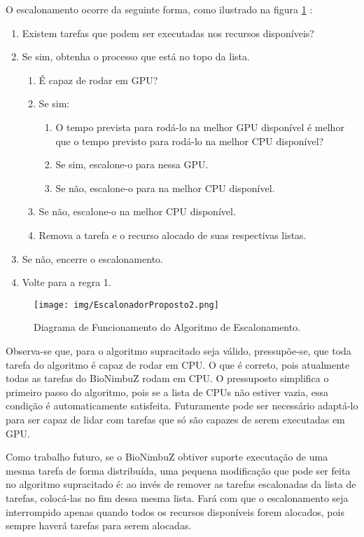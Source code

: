 O escalonamento ocorre da seguinte forma, como ilustrado na figura \ref{Escalonamento} :
\begin{enumerate}
	\item Existem tarefas que podem ser executadas nos recursos disponíveis?
	\item Se sim, obtenha o processo que está no topo da lista.
	\begin{enumerate}
		\item É capaz de rodar em GPU?
		\item Se sim:
		\begin{enumerate}
			\item O tempo prevista para rodá-lo na melhor \acrshort{GPU} disponível é melhor que o tempo previsto para rodá-lo na melhor \acrshort{CPU} disponível?
			\item Se sim, escalone-o para nessa \acrshort{GPU}.
			\item Se não, escalone-o para na melhor \acrshort{CPU} disponível.
		\end{enumerate}
		\item Se não, escalone-o na melhor \acrshort{CPU} disponível.
		\item Remova a tarefa e o recurso alocado de suas respectivas listas.
	\end{enumerate}
	\item Se não, encerre o escalonamento.
	\item Volte para a regra 1.
\end{enumerate}


\begin{figure}[htbp]
	\centerline{\texttt{[image: img/EscalonadorProposto2.png]}}
	\caption{Diagrama de Funcionamento do Algoritmo de Escalonamento.}
	\label{Escalonamento}
\end{figure}

Observa-se que, para o algoritmo supracitado seja válido, pressupõe-se, que toda tarefa do algoritmo é capaz de rodar em CPU. O que é correto, pois atualmente todas as tarefas do BioNimbuZ rodam em \acrshort{CPU}. O pressuposto simplifica o primeiro passo do algoritmo, pois se a lista de \acrshort{CPU}s não estiver vazia, essa condição é automaticamente satisfeita. Futuramente pode ser necessário adaptá-lo para ser capaz de lidar com tarefas que só são capazes de serem executadas em \acrshort{GPU}.

Como trabalho futuro, se o BioNimbuZ obtiver suporte executação de uma mesma tarefa de forma distribuída, uma pequena modificação que pode ser feita no algoritmo supracitado é: ao invés de remover as tarefas escalonadas da lista de tarefas, colocá-las no fim dessa mesma lista. Fará com que o escalonamento seja interrompido apenas quando todos os recursos disponíveis forem alocados, pois sempre haverá tarefas para serem alocadas.

